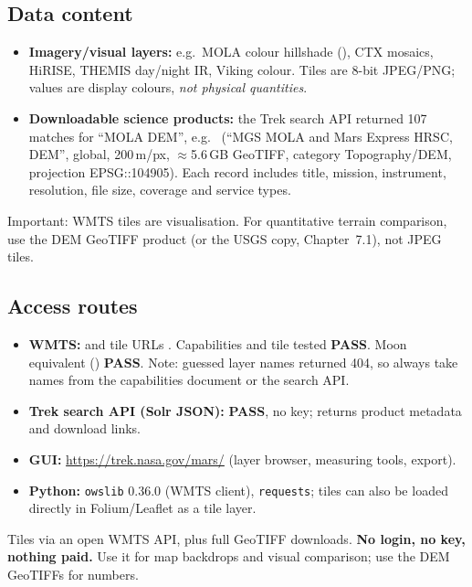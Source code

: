 \documentclass[10pt,a4paper]{article}
\newcommand{\OK}{\textcolor{ok}{\textbf{PASS}}}
\begin{document}
\subsection{Data content}
\begin{itemize}
\item \textbf{Imagery/visual layers:} e.g.\ MOLA colour hillshade (), CTX mosaics, HiRISE, THEMIS day/night IR, Viking colour. Tiles are 8-bit JPEG/PNG; values are display colours, \emph{not physical quantities}.
\item \textbf{Downloadable science products:} the Trek search API returned 107 matches for ``MOLA DEM'', e.g.\  (``MGS MOLA and Mars Express HRSC, DEM'', global, 200\,m/px, $\approx$5.6\,GB GeoTIFF, category Topography/DEM, projection EPSG::104905). Each record includes title, mission, instrument, resolution, file size, coverage and service types.
\end{itemize}
Important: WMTS tiles are visualisation. For quantitative terrain comparison, use the DEM GeoTIFF product (or the USGS copy, Chapter~7.1), not JPEG tiles.

\subsection{Access routes}
\begin{itemize}
\item \textbf{WMTS:}  and tile URLs . Capabilities and tile tested \OK{}. Moon equivalent () \OK{}. Note: guessed layer names returned 404, so always take names from the capabilities document or the search API.
\item \textbf{Trek search API (Solr JSON):}  \OK{}, no key; returns product metadata and download links.
\item \textbf{GUI:} \url{https://trek.nasa.gov/mars/} (layer browser, measuring tools, export).
\item \textbf{Python:} \texttt{owslib} 0.36.0 (WMTS client), \texttt{requests}; tiles can also be loaded directly in Folium/Leaflet as a tile layer.
\end{itemize}
\begin{verdict}
Tiles via an open WMTS API, plus full GeoTIFF downloads. \textbf{No login, no key, nothing paid.} Use it for map backdrops and visual comparison; use the DEM GeoTIFFs for numbers.
\end{verdict}
\end{document}
